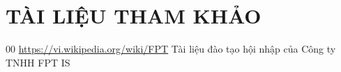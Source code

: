 \newpage

{\centering \section*{TÀI LIỆU THAM KHẢO}}

\begingroup
\renewcommand{\section}[2]{} %
\begin{thebibliography}{00}
 \url{https://vi.wikipedia.org/wiki/FPT}
 Tài liệu đào tạo hội nhập của Công ty TNHH FPT IS



\end{thebibliography}
\endgroup











\newpage
